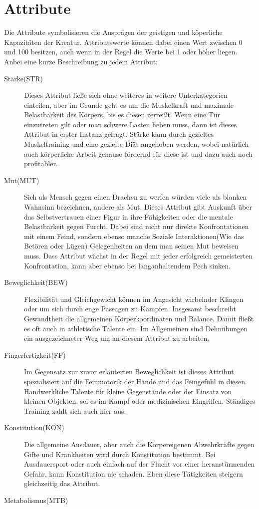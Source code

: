 \documentclass[a4paper,12pt,oneside]{book}
\begin{document}
\chapter{Attribute}
Die Attribute symbolisieren die Ausprägen der geistigen und köperliche Kapazitäten der Kreatur. Attributswerte können dabei einen Wert zwischen 0 und 100 besitzen, auch wenn in der Regel die Werte bei 1 oder höher liegen. Anbei eine kurze Beschreibung zu jedem Attribut:
\begin{description}
\item[Stärke(STR)]
Dieses Attribut ließe sich ohne weiteres in weitere Unterkategorien einteilen, aber im Grunde geht es um die Muskelkraft und maximale Belastbarkeit des Körpers, bis es diesen zerreißt. Wenn eine Tür einzutreten gilt oder man schwere Lasten heben muss, dann ist dieses Attribut in erster Instanz gefragt. Stärke kann durch gezieltes Muskeltraining und eine gezielte Diät angehoben werden, wobei natürlich auch körperliche Arbeit genauso fördernd für diese ist und dazu auch noch profitabler.
\item[Mut(MUT)]
Sich als Mensch gegen einen Drachen zu werfen würden viele als blanken Wahnsinn bezeichnen, andere als Mut. Dieses Attribut gibt Auskunft über das Selbstvertrauen einer Figur in ihre Fähigkeiten oder die mentale Belastbarkeit gegen Furcht. Dabei sind nicht nur direkte Konfrontationen mit einem Feind, sondern ebenso manche Soziale Interaktionen(Wie das Betören oder Lügen) Gelegenheiten an dem man seinen Mut beweisen muss. Dass Attribut wächst in der Regel mit jeder erfolgreich gemeisterten Konfrontation, kann aber ebenso bei langanhaltendem Pech sinken.
\item[Beweglichkeit(BEW)]
Flexibilität und Gleichgewicht können im Angesicht wirbelnder Klingen oder um sich durch enge Passagen zu Kämpfen. Insgesamt beschreibt Gewandtheit die allgemeinen Körperkoordinaten und Balance. Damit fließt es oft auch in athletische Talente ein. Im Allgemeinen sind Dehnübungen ein ausgezeichneter Weg um an diesem Attribut zu arbeiten.
\item[Fingerfertigkeit(FF)]
Im Gegensatz zur zuvor erläuterten Beweglichkeit ist dieses Attribut spezialisiert auf die Feinmotorik der Hände und das Feingefühl in diesen. Handwerkliche Talente für kleine Gegenstände oder der Einsatz von kleinen Objekten, sei es im Kampf oder medizinischen Eingriffen. Ständiges Training zahlt sich auch hier aus.
\item[Konstitution(KON)]
Die allgemeine Ausdauer, aber auch die Körpereigenen Abwehrkräfte gegen Gifte und Krankheiten wird durch Konstitution bestimmt. Bei Ausdauersport oder auch einfach auf der Flucht vor einer heranstürmenden Gefahr, kann Konstitution nie schaden. Eben diese Tätigkeiten steigern gleichzeitig das Attribut.
\item[Metabolismus(MTB)]


\end{description}
\end{document}

